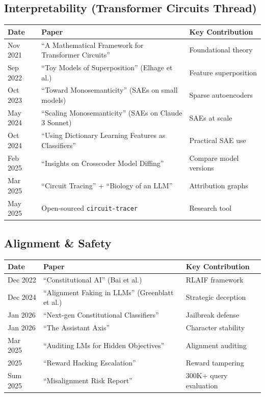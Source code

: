 \documentclass[11pt,a4paper]{article}
\begin{document}
\subsection{Interpretability (Transformer Circuits Thread)}

\begin{center}
\begin{tabular}{lL{8cm}l}
\toprule
\textbf{Date} & \textbf{Paper} & \textbf{Key Contribution} \\
\midrule
Nov 2021 & ``A Mathematical Framework for Transformer Circuits'' & Foundational theory \\
Sep 2022 & ``Toy Models of Superposition'' (Elhage et al.) & Feature superposition \\
Oct 2023 & ``Toward Monosemanticity'' (SAEs on small models) & Sparse autoencoders \\
May 2024 & ``Scaling Monosemanticity'' (SAEs on Claude 3 Sonnet) & SAEs at scale \\
Oct 2024 & ``Using Dictionary Learning Features as Classifiers'' & Practical SAE use \\
Feb 2025 & ``Insights on Crosscoder Model Diffing'' & Compare model versions \\
Mar 2025 & ``Circuit Tracing'' + ``Biology of an LLM'' & Attribution graphs \\
May 2025 & Open-sourced \texttt{circuit-tracer} & Research tool \\
\bottomrule
\end{tabular}
\end{center}

\subsection{Alignment \& Safety}

\begin{center}
\begin{tabular}{lL{8cm}l}
\toprule
\textbf{Date} & \textbf{Paper} & \textbf{Key Contribution} \\
\midrule
Dec 2022 & ``Constitutional AI'' (Bai et al.) & RLAIF framework \\
Dec 2024 & ``Alignment Faking in LLMs'' (Greenblatt et al.) & Strategic deception \\
Jan 2026 & ``Next-gen Constitutional Classifiers'' & Jailbreak defense \\
Jan 2026 & ``The Assistant Axis'' & Character stability \\
Mar 2025 & ``Auditing LMs for Hidden Objectives'' & Alignment auditing \\
2025 & ``Reward Hacking Escalation'' & Reward tampering \\
Sum 2025 & ``Misalignment Risk Report'' & 300K+ query evaluation \\
\bottomrule
\end{tabular}
\end{center}
\end{document}

